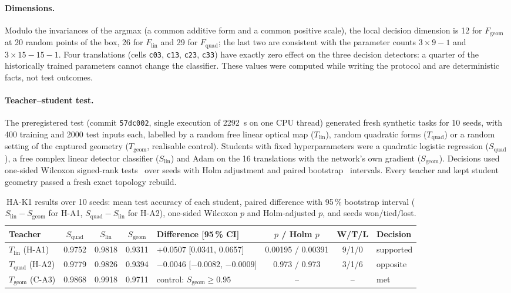 \documentclass[11pt,a4paper]{article}
\newcommand{\Fgeom}{F_{\mathrm{geom}}}
\newcommand{\Flin}{F_{\mathrm{lin}}}
\newcommand{\Fquad}{F_{\mathrm{quad}}}
\begin{document}
\paragraph{Dimensions.} Modulo the invariances of the argmax (a common additive form and a common positive scale), the local decision dimension is 12 for $\Fgeom$ at 20 random points of the box, 26 for $\Flin$ and 29 for $\Fquad$; the last two are consistent with the parameter counts $3\times9-1$ and $3\times15-15-1$. Four translations (cells \texttt{c03}, \texttt{c13}, \texttt{c23}, \texttt{c33}) have exactly zero effect on the three decision detectors: a quarter of the historically trained parameters cannot change the classifier. These values were computed while writing the protocol and are deterministic facts, not test outcomes.

\paragraph{Teacher--student test.} The preregistered test (commit \texttt{57dc002}, single execution of \SI{2292}{s} on one CPU thread) generated fresh synthetic tasks for 10 seeds, with 400 training and 2000 test inputs each, labelled by a random free linear optical map ($T_{\mathrm{lin}}$), random quadratic forms ($T_{\mathrm{quad}}$) or a random setting of the captured geometry ($T_{\mathrm{geom}}$, realisable control). Students with fixed hyperparameters were a quadratic logistic regression ($S_{\mathrm{quad}}$), a free complex linear detector classifier ($S_{\mathrm{lin}}$) and Adam on the 16 translations with the network's own gradient ($S_{\mathrm{geom}}$). Decisions used one-sided Wilcoxon signed-rank tests~\cite{wilcoxon1945} over seeds with Holm adjustment and paired bootstrap~\cite{efron1979} intervals. Every teacher and kept student geometry passed a fresh exact topology rebuild.

\begin{table}[t]
\centering
\caption{HA-K1 results over 10 seeds: mean test accuracy of each student, paired difference with 95\,\% bootstrap interval ($S_{\mathrm{lin}}-S_{\mathrm{geom}}$ for H-A1, $S_{\mathrm{quad}}-S_{\mathrm{lin}}$ for H-A2), one-sided Wilcoxon $p$ and Holm-adjusted $p$, and seeds won/tied/lost.}
\label{tab:hak1}
\footnotesize
\setlength{\tabcolsep}{4.5pt}
\begin{tabular}{@{}lccclccl@{}}
\toprule
Teacher & $S_{\mathrm{quad}}$ & $S_{\mathrm{lin}}$ & $S_{\mathrm{geom}}$ & Difference [95\,\% CI] & $p$ / Holm $p$ & W/T/L & Decision \\
\midrule
$T_{\mathrm{lin}}$ (H-A1) & 0.9752 & 0.9818 & 0.9311 & $+0.0507$ [0.0341, 0.0657] & 0.00195 / 0.00391 & 9/1/0 & supported \\
$T_{\mathrm{quad}}$ (H-A2) & 0.9779 & 0.9826 & 0.9394 & $-0.0046$ [$-0.0082$, $-0.0009$] & 0.973 / 0.973 & 3/1/6 & opposite \\
$T_{\mathrm{geom}}$ (C-A3) & 0.9868 & 0.9918 & 0.9711 & control: $S_{\mathrm{geom}} \ge 0.95$ & -- & -- & met \\
\bottomrule
\end{tabular}
\end{table}
\end{document}
